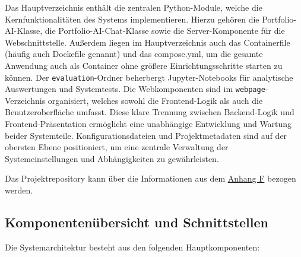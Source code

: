       Das Hauptverzeichnis enthält die zentralen Python-Module, welche die Kernfunktionalitäten des Systems implementieren.
      Hierzu gehören die Portfolio-AI-Klasse, die Portfolio-AI-Chat-Klasse sowie die Server-Komponente für die Webschnittstelle.
      Außerdem liegen im Hauptverzeichnis auch das Containerfile (häufig auch Dockefile genannt) und das compose.yml, um die gesamte Anwendung auch als Container ohne größere Einrichtungsschritte starten zu können.
      Der \texttt{evaluation}-Ordner beherbergt Jupyter-Notebooks für analytische Auswertungen und Systemtests.
      Die Webkomponenten sind im \texttt{webpage}-Verzeichnis organisiert, welches sowohl die Frontend-Logik als auch die Benutzeroberfläche umfasst.
      Diese klare Trennung zwischen Backend-Logik und Frontend-Präsentation ermöglicht eine unabhängige Entwicklung und Wartung beider Systemteile.
      Konfigurationsdateien und Projektmetadaten sind auf der obersten Ebene positioniert, um eine zentrale Verwaltung der Systemeinstellungen und Abhängigkeiten zu gewährleisten.

      Das Projektrepository kann über die Informationen aus dem \hyperref[sec:full_code]{Anhang F} bezogen werden.

    \subsection{Komponentenübersicht und Schnittstellen}

      Die Systemarchitektur besteht aus den folgenden Hauptkomponenten:

